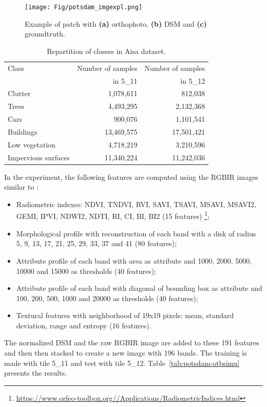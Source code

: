 \documentclass[journal,peerreview,onecolumn]{IEEEtran}
\begin{document}
    \begin{figure}[!t]
        \centering
        \texttt{[image: Fig/potsdam\_imgexpl.png]}
        \caption{Example of patch with {\bfseries{(a)}} orthophoto, {\bfseries{(b)}} DSM and {\bfseries{(c)}} groundtruth.\label{fig:potsdam-expl}}
    \end{figure}

    \begin{table}[!t]
        \centering
        \caption{Repartition of classes in Aisa dataset.\label{tab:potsdam}}
        \begin{tabular}[b]{lrr}\hline
          Class & Number of samples & Number of samples \\
                & in 5\_11          & in 5\_12 \\
          \hline
          Clutter             & 1,078,611  & 812,038 \\
          Trees               & 4,493,295  & 2,132,368 \\
          Cars                & 900,076    & 1,101,541 \\
          Buildings           & 13,469,575 & 17,501,421 \\
          Low vegetation      & 4,718,219  & 3,210,596 \\
          Impervious surfaces & 11,340,224 & 11,242,036 \\
          \hline
        \end{tabular}
    \end{table}

    In the experiment, the following features are computed using the RGBIR images similar to \cite{tuia2015multiclass}:
    \begin{itemize}
        \item Radiometric indexes: NDVI, TNDVI, RVI, SAVI, TSAVI, MSAVI, MSAVI2, GEMI, IPVI, NDWI2, NDTI, RI, CI, BI, BI2 (15 features) \footnote{\url{https://www.orfeo-toolbox.org//Applications/RadiometricIndices.html}};
        \item Morphological profile with reconstruction of each band with a disk of radius 5, 9, 13, 17, 21, 25, 29, 33, 37 and 41 (80 features)\cite{tuia2015multiclass};
        \item Attribute profile of each band with area as attribute and 1000, 2000, 5000, 10000 and 15000 as thresholds (40 features)\cite{tuia2015multiclass};
        \item Attribute profile of each band with diagonal of bounding box as attribute and 100, 200, 500, 1000 and 20000 as thresholds (40 features)\cite{tuia2015multiclass};
        \item Textural features with neighborhood of 19x19 pixels: mean, standard deviation, range and entropy (16 features)\cite{tuia2015multiclass}.
    \end{itemize}
    The normalized DSM and the raw RGBIR image are added to these 191 features and then then stacked to create a new image with 196 bands. The training is made with tile 5\_11 and test with tile 5\_12. Table~\ref{tab:potsdam-otbsimu} presents the results.
\end{document}
